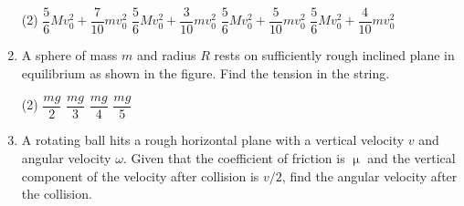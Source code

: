 \documentclass[11pt]{article}
\begin{document}
\begin{enumerate}
\begin{center}
        \end{center}
    \begin{tasks}(2)
        \task $\dfrac{5}{6}Mv_0^2  + \dfrac{7}{10} mv_0^2$\ans
        \task $\dfrac{5}{6}Mv_0^2  + \dfrac{3}{10} mv_0^2$
        \task $\dfrac{5}{6}Mv_0^2  + \dfrac{5}{10} mv_0^2$
        \task $\dfrac{5}{6}Mv_0^2  + \dfrac{4}{10} mv_0^2$
    \end{tasks}

\item A sphere of mass $m$ and radius $R$ rests on sufficiently rough inclined plane in equilibrium as shown in the figure. Find the tension in the string.
\begin{center}
    \end{center}
\begin{tasks}(2)
    \task $\dfrac{mg}{2}$
    \task $\dfrac{mg}{3}$
    \task $\dfrac{mg}{4}$\ans
    \task $\dfrac{mg}{5}$
\end{tasks}

\item A rotating ball hits a rough horizontal plane with a vertical velocity $v$ and angular velocity $\omega$. Given that the coefficient of friction is $\upmu$ and the vertical component of the velocity after collision is $v/2$, find the angular velocity after the collision.


\begin{center}
\end{center}




















\end{enumerate}
\end{document}
